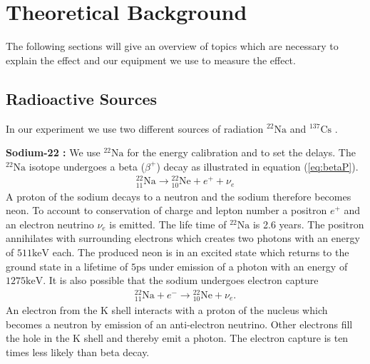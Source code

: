 \section{Theoretical Background}

\newcommand{\Na}{\ensuremath{{}^{22} \mathrm{Na}} }
\newcommand{\Cs}{\ensuremath{{}^{137} \mathrm{Cs}} }

The following sections will give an overview of topics which are necessary
to explain the \compton effect and our equipment we use to measure the
effect. 

\subsection{Radioactive Sources}
In our experiment we use two different sources of radiation \Na and \Cs .

\vspace{1em}\textbf{Sodium-22 \cite{naPaper}:} We use \Na for the energy calibration and to set the delays. The \Na isotope undergoes a 
beta ($\beta^+$) decay as illustrated in equation (\ref{eq:betaP}).
\begin{align}
  {}^{22}_{11} \mathrm{Na} \longrightarrow {}^{22}_{10} \mathrm{Ne} + e^+ + \nu_e
  \label{eq:betaP}
\end{align}
A proton of the sodium decays to a neutron and the sodium therefore becomes neon.
To account to conservation of charge and lepton number a positron $e^+$
and an electron neutrino $\nu_e$ is emitted. The life time of \Na is 2.6 years.
The positron annihilates with surrounding electrons which creates two
photons with an energy of $511 \mathrm{keV}$ each. The produced neon is
in an excited state which returns to the ground state in a lifetime of
$5 \mathrm{ps}$ under emission of a photon with an energy of
$1275 \mathrm{keV}$.
It is also possible that the sodium undergoes electron capture
\begin{align}
  {}^{22}_{11} \mathrm{Na} + e^- \longrightarrow {}^{22}_{10} \mathrm{Ne} +
  \nu_e.
  \label{eq:ecap}
\end{align}
An electron from the K shell interacts with a proton of the nucleus which
becomes a neutron by emission of an anti-electron neutrino.  Other electrons
fill the hole in the K shell and thereby emit a photon.  The electron
capture is ten times less likely than beta decay. 


